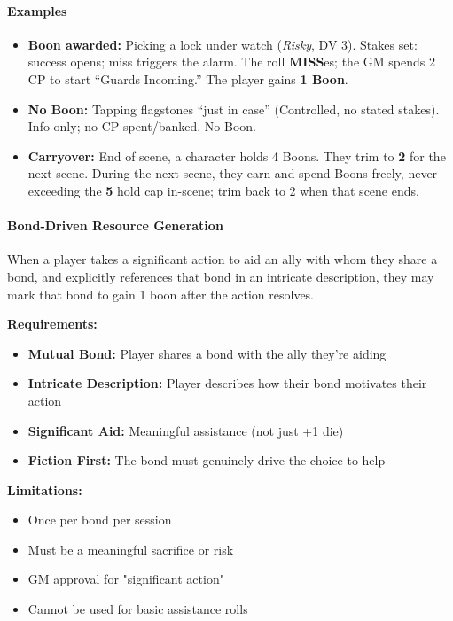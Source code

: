 \documentclass[11pt]{article}
\begin{document}
\paragraph{Examples}
\begin{itemize}
  \item \textbf{Boon awarded:} Picking a lock under watch (\emph{Risky}, DV 3). Stakes set: success opens; miss triggers the alarm. The roll \textbf{MISS}es; the GM spends 2 CP to start ``Guards Incoming.'' The player gains \textbf{1 Boon}.
  \item \textbf{No Boon:} Tapping flagstones ``just in case'' (Controlled, no stated stakes). Info only; no CP spent/banked. No Boon.
  \item \textbf{Carryover:} End of scene, a character holds 4 Boons. They trim to \textbf{2} for the next scene. During the next scene, they earn and spend Boons freely, never exceeding the \textbf{5} hold cap in-scene; trim back to 2 when that scene ends.
\end{itemize}

\paragraph{Bond-Driven Resource Generation}
When a player takes a significant action to aid an ally with whom they share a bond, and explicitly references that bond in an intricate description, they may mark that bond to gain 1 boon after the action resolves.

\textbf{Requirements:}
\begin{itemize}
    \item \textbf{Mutual Bond:} Player shares a bond with the ally they're aiding
    \item \textbf{Intricate Description:} Player describes how their bond motivates their action
    \item \textbf{Significant Aid:} Meaningful assistance (not just +1 die)
    \item \textbf{Fiction First:} The bond must genuinely drive the choice to help
\end{itemize}

\textbf{Limitations:}
\begin{itemize}
    \item Once per bond per session
    \item Must be a meaningful sacrifice or risk
    \item GM approval for "significant action"
    \item Cannot be used for basic assistance rolls
\end{itemize}
\end{document}
